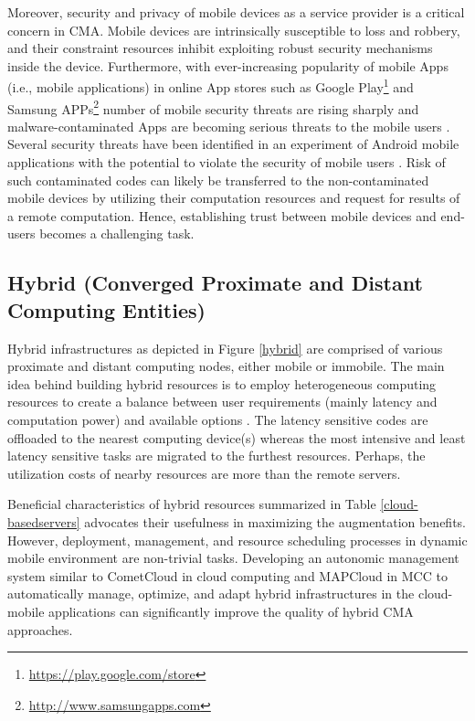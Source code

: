 \documentclass[publish]{IEEEtran}
\begin{document}
Moreover, security and privacy of mobile devices as a service provider is a critical concern in CMA. Mobile devices are intrinsically susceptible to loss and robbery, and their constraint resources inhibit exploiting robust security mechanisms inside the device. Furthermore, with ever-increasing popularity of mobile Apps (i.e., mobile applications) in online App stores such as Google Play\footnote{\url{https://play.google.com/store}} and Samsung APPs\footnote{\url{http://www.samsungapps.com}} \cite{Shen2012} number of mobile security threats are rising sharply and malware-contaminated Apps are becoming serious threats to the mobile users \cite{ANIA2012}. Several security threats have been identified in an experiment of Android mobile applications with the potential to violate the security of mobile users \cite{Enck}. Risk of such contaminated codes can likely be transferred to the non-contaminated mobile devices by utilizing their computation resources and request for results of a remote computation. Hence, establishing trust between mobile devices and end-users becomes a challenging task.

\subsection{Hybrid (Converged Proximate and Distant Computing Entities)}
Hybrid infrastructures as depicted in Figure \ref{hybrid} are comprised of various proximate and distant computing nodes, either mobile or immobile. The main idea behind building hybrid resources is to employ heterogeneous computing resources to create a balance between user requirements (mainly latency and computation power) and available options \cite{Rahimi2012}. The latency sensitive codes are offloaded to the nearest computing device(s) whereas the most intensive and least latency sensitive tasks are migrated to the furthest resources. Perhaps, the utilization costs of nearby resources are more than the remote servers. 

Beneficial characteristics of hybrid resources summarized in Table \ref{cloud-basedservers} advocates their usefulness in maximizing the augmentation benefits. However, deployment, management, and resource scheduling processes in dynamic mobile environment are non-trivial tasks. Developing an autonomic management system similar to CometCloud \cite{Kim2011} in cloud computing and MAPCloud \cite{Rahimi2012} in MCC to automatically manage, optimize, and adapt hybrid infrastructures in the cloud-mobile applications can significantly improve the quality of hybrid CMA approaches.
\end{document}
